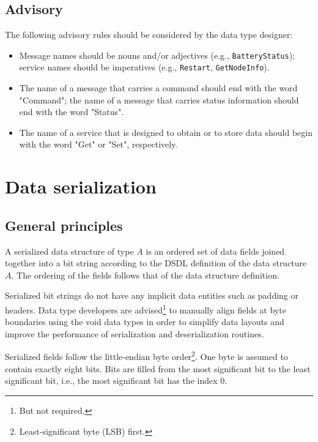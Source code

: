 \subsection{Advisory}

The following advisory rules should be considered by the data type designer:

\begin{itemize}
    \item Message names should be nouns and/or adjectives (e.g., \verb|BatteryStatus|);
    service names should be imperatives (e.g., \verb|Restart|, \verb|GetNodeInfo|).

    \item The name of a message that carries a command should end with the word "Command";
          the name of a message that carries status information should end with the word "Status".

    \item The name of a service that is designed to obtain or to store data should begin with the word
          "Get" or "Set", respectively.
\end{itemize}

\section{Data serialization}\label{sec:dsdl_data_serialization}

\subsection{General principles}

A serialized data structure of type $A$ is an ordered set of data fields joined together into a bit string
according to the DSDL definition of the data structure $A$.
The ordering of the fields follows that of the data structure definition.

Serialized bit strings do not have any implicit data entities such as padding or headers.
Data type developers are advised\footnote{But not required.} to manually align fields at
byte boundaries using the void data types
in order to simplify data layouts and improve the performance of serialization and deserialization routines.

Serialized fields follow the little-endian byte order\footnote{Least-significant byte (LSB) first.}.
One byte is assumed to contain exactly eight bits.
Bits are filled from the most significant bit to the least significant bit,
i.e., the most significant bit has the index 0.

